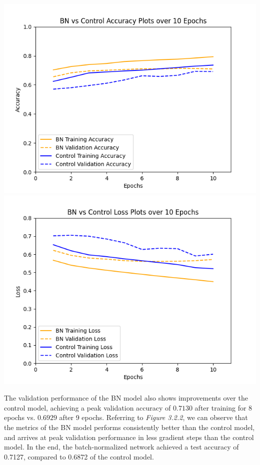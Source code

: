 \documentclass{article}
\newenvironment{Figure}
  {\par\medskip\noindent\minipage{\linewidth}}
  {\endminipage\par\medskip}
\begin{document}
\begin{multicols*}{2}
\begin{Figure}
    \captionsetup{labelformat=empty}
    \includegraphics[width=\linewidth]{AccHist.png}
    \includegraphics[width=\linewidth]{LossHist.png}
\end{Figure}

The validation performance of the BN model also shows improvements over the 
control model, achieving a peak validation accuracy of $0.7130$ after training
for 8 epochs vs. $0.6929$ after 9 epochs. Referring to \textit{Figure 3.2.2}, 
we can observe that the metrics of the BN model performs consistently better 
than the control model, and arrives at peak validation performance in less
gradient steps than the control model. In the end, the batch-normalized network 
achieved a test accuracy of 0.7127, compared to 0.6872 of the control model.



\end{multicols*}
\end{document}
